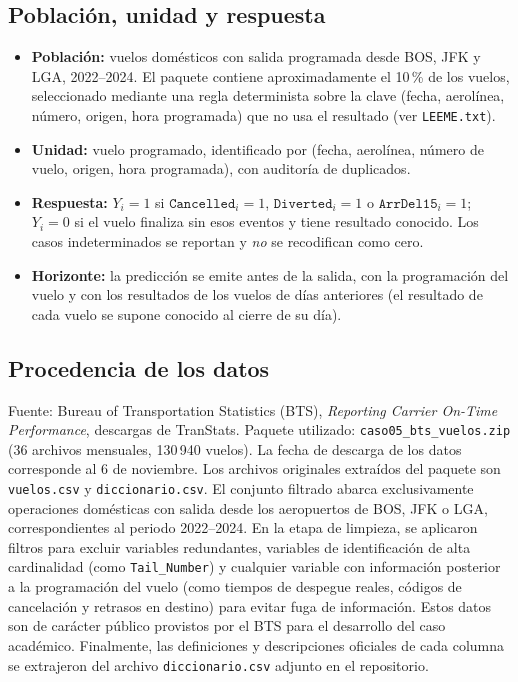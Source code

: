 \documentclass[11pt,a4paper]{article}
\newcommand{\code}[1]{\texttt{#1}}
\begin{document}
\subsection{Población, unidad y respuesta}
\begin{itemize}[leftmargin=*]
  \item \textbf{Población:} vuelos domésticos con salida programada desde BOS, JFK y LGA, 2022--2024. El paquete contiene aproximadamente el 10\,\% de los vuelos, seleccionado mediante una regla determinista sobre la clave (fecha, aerolínea, número, origen, hora programada) que no usa el resultado (ver \code{LEEME.txt}).
  \item \textbf{Unidad:} vuelo programado, identificado por (fecha, aerolínea, número de vuelo, origen, hora programada), con auditoría de duplicados.
  \item \textbf{Respuesta:} $Y_i = 1$ si $\texttt{Cancelled}_i = 1$, $\texttt{Diverted}_i = 1$ o $\texttt{ArrDel15}_i = 1$; $Y_i = 0$ si el vuelo finaliza sin esos eventos y tiene resultado conocido. Los casos indeterminados se reportan y \emph{no} se recodifican como cero.
  \item \textbf{Horizonte:} la predicción se emite antes de la salida, con la programación del vuelo y con los resultados de los vuelos de días anteriores (el resultado de cada vuelo se supone conocido al cierre de su día).
\end{itemize}
 
\subsection{Procedencia de los datos}
Fuente: Bureau of Transportation Statistics (BTS), \emph{Reporting Carrier On-Time Performance}, descargas de TranStats. Paquete utilizado: \code{caso05\_bts\_vuelos.zip} (36 archivos mensuales, 130\,940 vuelos). La fecha de descarga de los datos corresponde al 6 de noviembre. Los archivos originales extraídos del paquete son \texttt{vuelos.csv} y \texttt{diccionario.csv}. El conjunto filtrado abarca exclusivamente operaciones domésticas con salida desde los aeropuertos de BOS, JFK o LGA, correspondientes al periodo 2022–2024. En la etapa de limpieza, se aplicaron filtros para excluir variables redundantes, variables de identificación de alta cardinalidad (como \texttt{Tail\_Number}) y cualquier variable con información posterior a la programación del vuelo (como tiempos de despegue reales, códigos de cancelación y retrasos en destino) para evitar fuga de información. Estos datos son de carácter público provistos por el BTS para el desarrollo del caso académico. Finalmente, las definiciones y descripciones oficiales de cada columna se extrajeron del archivo \texttt{diccionario.csv} adjunto en el repositorio.
 
\end{document}
